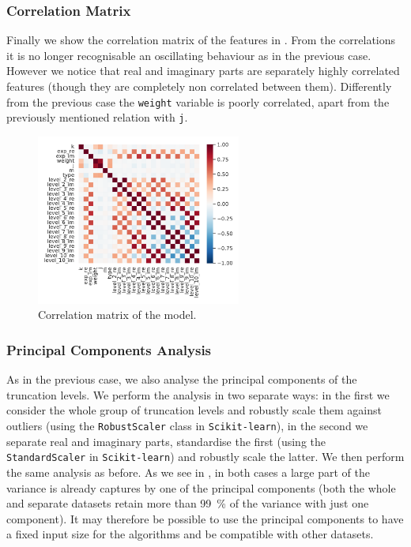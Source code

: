 \subsubsection{Correlation Matrix}

Finally we show the correlation matrix of the features in .
From the correlations it is no longer recognisable an oscillating behaviour as in the previous case.
However we notice that real and imaginary parts are separately highly correlated features (though they are completely non correlated between them).
Differently from the previous case the \texttt{weight} variable is poorly correlated, apart from the previously mentioned relation with \texttt{j}.

\begin{figure}[htbp]
  \centering
  \includegraphics[width=0.6\textwidth]{img/wzw_corr_mat}
  \caption{Correlation matrix of the \wzw model.}
  \label{fig:wzw:corr}
\end{figure}


\subsubsection{Principal Components Analysis}

As in the previous case, we also analyse the principal components of the truncation levels.
We perform the analysis in two separate ways: in the first we consider the whole group of truncation levels and robustly scale them against outliers (using the \texttt{RobustScaler} class in \texttt{Scikit-learn}), in the second we separate real and imaginary parts, standardise the first (using the \texttt{StandardScaler} in \texttt{Scikit-learn}) and robustly scale the latter.
We then perform the same analysis as before.
As we see in , in both cases a large part of the variance is already captures by one of the principal components (both the whole and separate datasets retain more than \SI{99}{\percent} of the variance with just one component).
It may therefore be possible to use the principal components to have a fixed input size for the algorithms and be compatible with other datasets.

